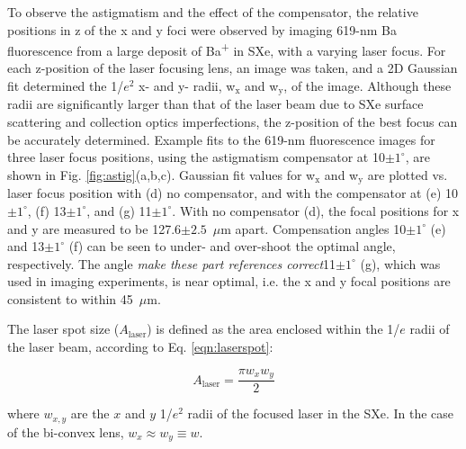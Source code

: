 To observe the astigmatism and the effect of the compensator, the relative positions in z of the x and y foci were observed by imaging 619-nm Ba fluorescence from a large deposit of Ba\textsuperscript{+} in SXe, with a varying laser focus.  For each z-position of the laser focusing lens, an image was taken, and a 2D Gaussian fit determined the 1/$e^{2}$ x- and y- radii, w$_{\text{x}}$ and w$_{\text{y}}$, of the image.  Although these radii are significantly larger than that of the laser beam due to SXe surface scattering and collection optics imperfections, the z-position of the best focus can be accurately determined.  Example fits to the 619-nm fluorescence images for three laser focus positions, using the astigmatism compensator at 10$\pm 1^{\circ}$, are shown in Fig. \ref{fig:astig}(a,b,c).  Gaussian fit values for w$_{\text{x}}$ and w$_{\text{y}}$ are plotted vs. laser focus position with (d) no compensator, and with the compensator at (e) 10$\pm 1^{\circ}$, (f) 13$\pm 1^{\circ}$, and (g) 11$\pm 1^{\circ}$.  With no compensator (d), the focal positions for x and y are measured to be 127.6$ \pm 2.5$~$\mu$m apart.  Compensation angles 10$\pm 1^{\circ}$ (e) and 13$\pm 1^{\circ}$ (f) can be seen to under- and over-shoot the optimal angle, respectively.  The angle \emph{\color{red}make these part references correct}11$\pm 1^{\circ}$ (g), which was used in imaging experiments, is near optimal, i.e. the x and y focal positions are consistent to within 45~$\mu$m.  %

The laser spot size ($A_{\text{laser}}$) is defined as the area enclosed within the 1/$e$ radii of the laser beam, according to Eq. \ref{eqn:laserspot}:

\begin{equation}
A_{\text{laser}} = \frac{\pi w_{x} w_{y}}{2}
\label{eqn:laserspot}
\end{equation}

\noindent
where $w_{x,y}$ are the $x$ and $y$ 1/$e^{2}$ radii of the focused laser in the SXe.  In the case of the bi-convex lens, $w_{x} \approx w_{y} \equiv w$.



